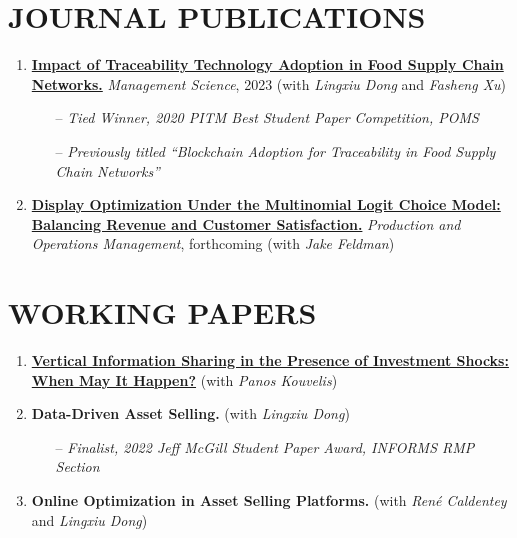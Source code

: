 \documentclass[margin]{res} %
\begin{document}
\begin{resume}
\section{JOURNAL PUBLICATIONS}
\begin{enumerate}[leftmargin=*]
    \item %
        \href{https://pubsonline.informs.org/doi/abs/10.1287/mnsc.2022.4440?casa_token=br5-nMm53OIAAAAA:nQxcEPswA7DUJZgJ1CZsL0DModEzd-a-1Y5zOh68ebSQo1LU177cocuRpaC3BXYQcoELLTilwzPY}{\textbf{Impact of Traceability Technology Adoption in Food Supply Chain Networks.}} {\it Management Science}, 2023 (with {\it Lingxiu Dong} and {\it Fasheng Xu})
        \begin{itemize}
            \item[--] {\it Tied Winner, 2020 PITM Best Student Paper Competition, POMS}
            \item[--] {\it Previously titled ``Blockchain Adoption for Traceability in Food Supply Chain Networks''}
        \end{itemize}
    \item \href{https://papers.ssrn.com/sol3/papers.cfm?abstract_id=3909033}{\textbf{Display Optimization Under the Multinomial Logit Choice Model: Balancing Revenue and Customer Satisfaction.}} {\it Production and Operations Management}, forthcoming (with {\it Jake Feldman})
\end{enumerate}


    \section{WORKING PAPERS}
    \begin{enumerate}[resume,leftmargin=*]
        \item \href{https://papers.ssrn.com/sol3/papers.cfm?abstract_id=3936170}{\textbf{Vertical Information Sharing in the Presence of Investment Shocks: When May It Happen?}} (with {\it Panos Kouvelis})
        \item \textbf{Data-Driven Asset Selling.} (with {\it Lingxiu Dong})
            \begin{itemize}
                \item[--] {\it Finalist, 2022 Jeff McGill Student Paper Award, INFORMS RMP Section}
            \end{itemize}
        \item \textbf{Online Optimization in Asset Selling Platforms.} (with {\it Ren\'{e} Caldentey} and {\it Lingxiu Dong})
    \end{enumerate}



\end{resume}
\end{document}
